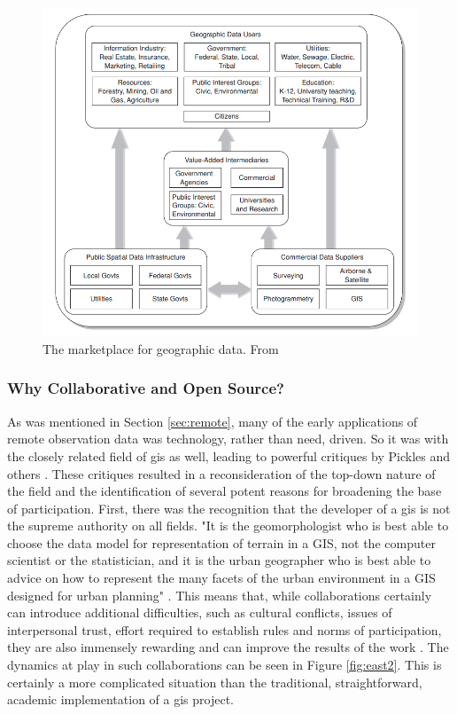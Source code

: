 \begin{figure}[h]
	\centering
	\includegraphics[scale=0.4]{Figures/chap2/GISMarketplace.png}
	\caption[The marketplace for geographic data]{The marketplace for geographic data. From \cite{cowenAvailabilityGeographicData2007}}
	\label{fig:marketplace}
\end{figure}

\subsubsection{Why Collaborative and Open Source?}

As was mentioned in Section \ref{sec:remote}, many of the early applications of remote observation data was technology, rather than need, driven. So it was with the closely related field of \ac{gis} as well, leading to powerful critiques by Pickles and others \cite{picklesGroundTruthSocial1994}. These critiques resulted in a reconsideration of the top-down nature of the field and the identification of several potent reasons for broadening the base of participation. First, there was the recognition that the developer of a \ac{gis} is not the supreme authority on all fields. "It is the geomorphologist who is best able to choose the data model for representation of terrain in a GIS, not the computer scientist or the statistician, and it is the urban geographer who is best able to advice on how to represent the many facets of the urban environment in a GIS designed for urban planning" \cite{goodchildGeographicInformationSystems1994}. This means that, while collaborations certainly can introduce additional difficulties, such as cultural conflicts, issues of interpersonal trust, effort required to establish rules and norms of participation, they are also immensely rewarding and can improve the results of the work \cite{tullochInstitutionalGeographicInformation2007}. The dynamics at play in such collaborations can be seen in Figure \ref{fig:east2}. This is certainly a more complicated situation than the traditional, straightforward, academic implementation of a \ac{gis} project.


